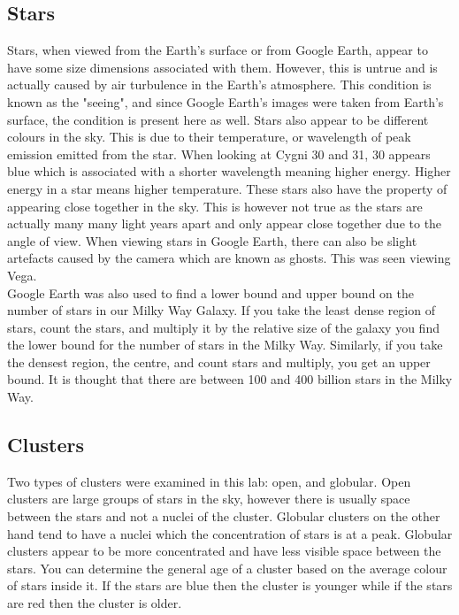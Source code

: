 \documentclass{article}
\begin{document}
\subsection{Stars}
Stars, when viewed from the Earth's surface or from Google Earth, appear to have some size
dimensions associated with them. However, this is untrue and is actually caused by air turbulence
in the Earth's atmosphere. This condition is known as the "seeing", and since Google Earth's
images were taken from Earth's surface, the condition is present here as well. Stars also appear
to be different colours in the sky. This is due to their temperature, or wavelength of peak emission
emitted from the star. When looking at Cygni 30 and 31, 30 appears blue which is associated with
a shorter wavelength meaning higher energy. Higher energy in a star means higher temperature.
These stars also have the property of appearing close together in the sky. This is however not
true as the stars are actually many many light years apart and only appear close together due to
the angle of view. When viewing stars in Google Earth, there can also be slight artefacts
caused by the camera which are known as ghosts. This was seen viewing Vega.\\

Google Earth was also used to find a lower bound and upper bound on the number of stars in
our Milky Way Galaxy. If you take the least dense region of stars, count the stars, and multiply it by the 
relative size of the galaxy you find the lower bound for the number of stars in the Milky Way.
Similarly, if you take the densest region, the centre, and count stars and multiply, you
get an upper bound. It is thought that there are between 100 and 400 billion stars in the Milky
Way.

\subsection{Clusters}
Two types of clusters were examined in this lab: open, and globular. Open clusters are large
groups of stars in the sky, however there is usually space between the stars and not a 
nuclei of the cluster. Globular clusters on the other hand tend to have a nuclei which 
the concentration of stars is at a peak. Globular clusters appear to be more concentrated
and have less visible space between the stars. You can determine the general age of a cluster
based on the average colour of stars inside it. If the stars are blue then the cluster is
younger while if the stars are red then the cluster is older. 
\end{document}
